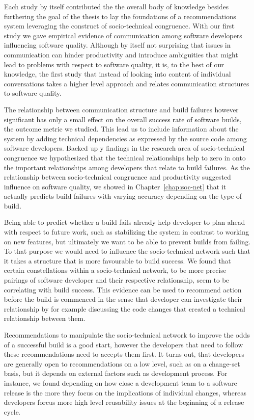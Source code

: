 Each study by itself contributed the the overall body of knowledge besides furthering the goal of the thesis to lay the foundations of a recommendations system leveraging the construct of socio-technical congruence.
With our first study we gave empirical evidence of communication among software developers influencing software quality.
Although by itself not surprising that issues in communication can hinder productivity and introduce ambiguities that might lead to problems with respect to software quality, it is, to the best of our knowledge, the first study that instead of looking into content of individual  conversations takes a higher level approach and relates communication structures to software quality.

The relationship between communication structure and build failures however significant has only a small effect on the overall success rate of software builds, the outcome metric we studied.
This lead us to include information about the system by adding technical dependencies as expressed by the source code among software developers.
Backed up y findings in the research area of socio-technical congruence we hypothesized that the technical relationships help to zero in onto the important relationships among developers that relate to build failures.
As the relationship between socio-technical congruence and productivity suggested influence on software quality, we showed in Chapter~\ref{chap:soc-net} that it actually predicts build failures with varying accuracy depending on the type of build.

Being able to predict whether a build fails already help developer to plan ahead with respect to future work, such as stabilizing the system in contrast to working on new features, but ultimately we want to be able to prevent builds from failing.
To that purpose we would need to influence the socio-technical network such that it takes a structure that is more favourable to build success.
We found that certain constellations within a socio-technical network, to be more precise pairings of software developer and their respective relationship, seem to be correlating with build success.
This evidence can be used to recommend action before the build is commenced in the sense that developer can investigate their relationship by for example discussing the code changes that created a technical relationship between them.

Recommendations to manipulate the socio-technical network to improve the odds of a successful build is a good start, however the developers that need to follow these recommendations need to accepts them first.
It turns out, that developers are generally open to recommendations on a low level, such as on a change-set basis, but it depends on external factors such as development process.
For instance, we found depending on how close a development team to a software release is the more they focus on the implications of individual changes, whereas developers forcus more high level reusability issues at the beginning of a release cycle.

